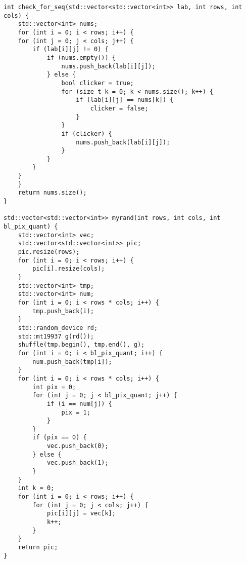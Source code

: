 \documentclass{report}
\begin{document}
\begin{lstlisting}
int check_for_seq(std::vector<std::vector<int>> lab, int rows, int cols) {
    std::vector<int> nums;
    for (int i = 0; i < rows; i++) {
    for (int j = 0; j < cols; j++) {
        if (lab[i][j] != 0) {
            if (nums.empty()) {
                nums.push_back(lab[i][j]);
            } else {
                bool clicker = true;
                for (size_t k = 0; k < nums.size(); k++) {
                    if (lab[i][j] == nums[k]) {
                        clicker = false;
                    }
                }
                if (clicker) {
                    nums.push_back(lab[i][j]);
                }
            }
        }
    }
    }
    return nums.size();
}

std::vector<std::vector<int>> myrand(int rows, int cols, int bl_pix_quant) {
    std::vector<int> vec;
    std::vector<std::vector<int>> pic;
    pic.resize(rows);
    for (int i = 0; i < rows; i++) {
        pic[i].resize(cols);
    }
    std::vector<int> tmp;
    std::vector<int> num;
    for (int i = 0; i < rows * cols; i++) {
        tmp.push_back(i);
    }
    std::random_device rd;
    std::mt19937 g(rd());
    shuffle(tmp.begin(), tmp.end(), g);
    for (int i = 0; i < bl_pix_quant; i++) {
        num.push_back(tmp[i]);
    }
    for (int i = 0; i < rows * cols; i++) {
        int pix = 0;
        for (int j = 0; j < bl_pix_quant; j++) {
            if (i == num[j]) {
                pix = 1;
            }
        }
        if (pix == 0) {
            vec.push_back(0);
        } else {
            vec.push_back(1);
        }
    }
    int k = 0;
    for (int i = 0; i < rows; i++) {
        for (int j = 0; j < cols; j++) {
            pic[i][j] = vec[k];
            k++;
        }
    }
    return pic;
}


\end{lstlisting}
\end{document}
